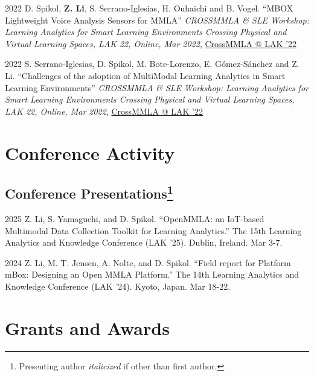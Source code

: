 \documentclass[11pt,letterpaper]{report}
\begin{document}
    \begin{tablist}

        \item[2022] \tab{} D. Spikol, \textbf{Z. Li}, S. Serrano-Iglesias, H. Ouhaichi and B. Vogel. \enquote{MBOX Lightweight Voice Analysis Sensors for MMLA} \textit{CROSSMMLA \& SLE Workshop: Learning Analytics for Smart Learning Environments Crossing Physical and Virtual Learning Spaces, LAK 22, Online, Mar 2022}, \href{https://lizaibeim.github.io/pubs/CROSSMMLA22_paper_5.pdf}{CrossMMLA @ LAK '22}
        \item[2022] \tab{} S. Serrano-Iglesias, D. Spikol, M. Bote-Lorenzo, E. Gómez-Sánchez and Z. Li. \enquote{Challenges of the adoption of MultiModal Learning Analytics in Smart Learning Environments} \textit{CROSSMMLA \& SLE Workshop: Learning Analytics for Smart Learning Environments Crossing Physical and Virtual Learning Spaces, LAK 22, Online, Mar 2022}, \href{https://lizaibeim.github.io/pubs/CROSSMMLA22_paper_2.pdf}{CrossMMLA @ LAK '22}

    \end{tablist}


    \section*{Conference Activity}

    \subsection*{Conference Presentations\footnote{Presenting author \textit{italicized} if other than first author.}}

    \begin{tablist}
        \item[2025] \tab{}Z. Li, S. Yamaguchi, and D. Spikol. \enquote{OpenMMLA: an IoT-based Multimodal Data Collection Toolkit for Learning Analytics.} The 15th Learning Analytics and Knowledge Conference (LAK '25). Dublin, Ireland. Mar 3-7.
        \item[2024] \tab{}Z. Li, M. T. Jensen, A. Nolte, and D. Spikol. \enquote{Field report for Platform mBox: Designing an Open MMLA Platform.} The 14th Learning Analytics and Knowledge Conference (LAK '24). Kyoto, Japan. Mar 18-22.
    \end{tablist}



    \section*{Grants and Awards}
\end{document}
